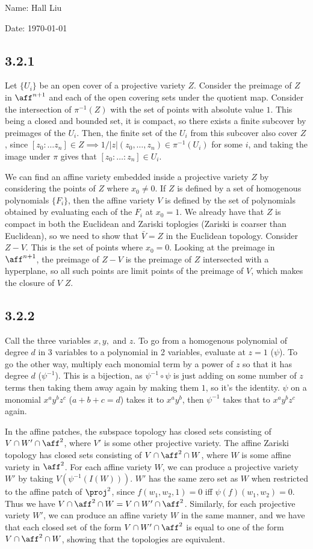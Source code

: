 \documentclass{article}
\begin{document}
Name: Hall Liu

Date: \today 
\vspace{1.5cm}

\subsection*{3.2.1}
Let $\{U_i\}$ be an open cover of a projective variety $Z$. Consider the preimage of $Z$ in $\aff^{n+1}$ and each of the open covering sets under the quotient map. Consider the intersection of $\pi^{-1}(Z)$ with the set of points with absolute value $1$. This being a closed and bounded set, it is compact, so there exists a finite subcover by preimages of the $U_i$. Then, the finite set of the $U_i$ from this subcover also cover $Z$, since $[z_0:\ldots z_n]\in Z\implies 1/|z|(z_0,\ldots,z_n)\in\pi^{-1}(U_i)$ for some $i$, and taking the image under $\pi$ gives that $[z_0:\ldots:z_n]\in U_i$.

We can find an affine variety embedded inside a projective variety $Z$ by considering the points of $Z$ where $x_0\neq0$. If $Z$ is defined by a set of homogenous polynomials $\{F_i\}$, then the affine variety $V$ is defined by the set of polynomials obtained by evaluating each of the $F_i$ at $x_0=1$. We already have that $Z$ is compact in both the Euclidean and Zariski toplogies (Zariski is coarser than Euclidean), so we need to show that $\bar{V}=Z$ in the Euclidean topology. Consider $Z-V$. This is the set of points where $x_0=0$. Looking at the preimage in $\aff^{n+1}$, the preimage of $Z-V$ is the preimage of $Z$ intersected with a hyperplane, so all such points are limit points of the preimage of $V$, which makes the closure of $V$ $Z$.
\subsection*{3.2.2}
Call the three variables $x,y,$ and $z$. To go from a homogenous polynomial of degree $d$ in 3 variables to a polynomial in 2 variables, evaluate at $z=1$ ($\psi$). To go the other way, multiply each monomial term by a power of $z$ so that it has degree $d$ ($\psi^{-1}$). This is a bijection, as $\psi^{-1}\circ\psi$ is just adding on some number of $z$ terms then taking them away again by making them $1$, so it's the identity. $\psi$ on a monomial $x^ay^bz^c$ ($a+b+c=d$) takes it to $x^ay^b$, then $\psi^{-1}$ takes that to $x^ay^bz^c$ again. 

In the affine patches, the subspace topology has closed sets consisting of $V\cap W'\cap\aff^2$, where $V'$ is some other projective variety. The affine Zariski topology has closed sets consisting of $V\cap\aff^2\cap W$, where $W$ is some affine variety in $\aff^2$. For each affine variety $W$, we can produce a projective variety $W'$ by taking $V(\psi^{-1}(I(W)))$. $W'$ has the same zero set as $W$ when restricted to the affine patch of $\proj^2$, since $f(w_1,w_2,1)=0$ iff $\psi(f)(w_1,w_2)=0$. Thus we have $V\cap\aff^2\cap W=V\cap W'\cap\aff^2$. Similarly, for each projective variety $W'$, we can produce an affine variety $W$ in the same manner, and we have that each closed set of the form $V\cap W'\cap\aff^2$ is equal to one of the form $V\cap\aff^2\cap W$, showing that the topologies are equivalent.
\end{document}
